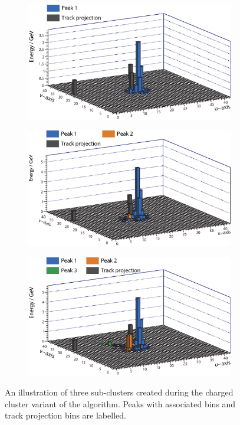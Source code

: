 \begin{figure}[tbph]
\centering
  \begin{subfigure}[b]{0.65\textwidth}
    \includegraphics[width=\textwidth]{photon/2Dpeak/charge1}
    \caption{}
    \label{fig:photon2DpeakCharge1}
  \end{subfigure}
  \begin{subfigure}[b]{0.65\textwidth}
    \includegraphics[width=\textwidth]{photon/2Dpeak/charge2}
    \caption{}
    \label{fig:photon2DpeakCharge2}
  \end{subfigure}
  \begin{subfigure}[b]{0.65\textwidth}
    \includegraphics[width=\textwidth]{photon/2Dpeak/charge3}
    \caption{}
    \label{fig:photon2DpeakCharge3}
  \end{subfigure}
\caption
{An illustration of three sub-clusters created during the charged cluster variant of the \peakFinding algorithm. Peaks with associated bins and track projection bins are labelled.}
\label{fig:photon2DpeakCharge}
\end{figure}


